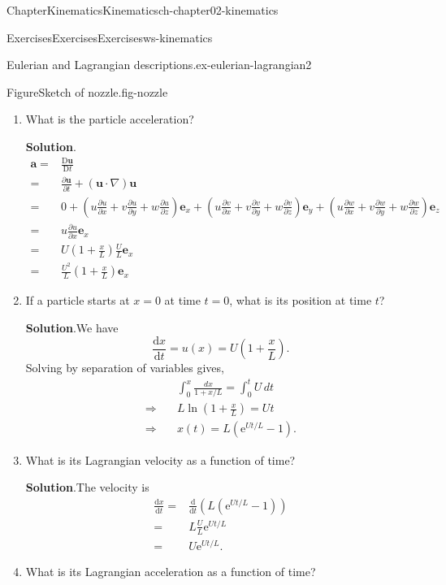 \documentclass[oneside,10pt,]{book}
\newcommand{\blocktitlefont}{\relax}
\numberwithin{equation}{section}
\newcommand{\e}{\mathrm{e}}
\newcommand{\de}{\mathrm{d}}
\newcommand{\dd}[2]{\frac{\de#1}{\de#2}}
\newcommand{\DD}[2]{\frac{\mathrm{D}#1}{\mathrm{D}#2}}
\newcommand{\pd}[2]{\frac{\partial#1}{\partial#2}}
\newcommand{\be}{\boldsymbol{e}}
\newcommand{\bu}{\boldsymbol{u}}
\newcommand{\ba}{\boldsymbol{a}}
\begin{document}
\begin{chapterptx}{Chapter}{Kinematics}{}{Kinematics}{}{}{ch-chapter02-kinematics}
\begin{exercises-section}{Exercises}{Exercises}{}{Exercises}{}{}{ws-kinematics}
\begin{divisionexercise}{4}{Eulerian and Lagrangian descriptions.}{}{ex-eulerian-lagrangian2}
\begin{figureptx}{Figure}{Sketch of nozzle.}{fig-nozzle}{}
\begin{image}{0.2}{0.6}{0.2}{}
\end{image}%
\tcblower
\end{figureptx}%
\begin{enumerate}[font=\bfseries,label=(\alph*),ref=\alph*]%
\item{}What is the particle acceleration?%
\par\smallskip%
\noindent\textbf{\blocktitlefont Solution}.\hypertarget{ex-eulerian-lagrangian2-3-2}{}\quad{}%
\begin{align*}
\ba=&\DD{\bu}{t} \\
=& \pd{\bu}{t} + (\bu \cdot \nabla) \bu\\
=&0+\left(u\pd{u}{x}+v\pd{u}{y}+w\pd{u}{z}\right)\be_x
+\left(u\pd{v}{x}+v\pd{v}{y}+w\pd{v}{z}\right)\be_y
+\left(u\pd{w}{x}+v\pd{w}{y}+w\pd{w}{z}\right)\be_z\\
=& u\pd{u}{x}\be_x\\
= & U\left(1+\frac{x}{L}\right)\frac{U}{L}\be_x\\
= & \frac{U^2}{L}\left(1+\frac{x}{L}\right)\be_x
\end{align*}
%
\item{}If a particle starts at \(x=0\) at time \(t=0\), what is its position at time \(t\)?%
\par\smallskip%
\noindent\textbf{\blocktitlefont Solution}.\hypertarget{ex-eulerian-lagrangian2-4-2}{}\quad{}We have%
\begin{equation*}
\dd{x}{t}=u(x)=U\left(1+\frac{x}{L}\right).
\end{equation*}
Solving by separation of variables gives,%
\begin{align*}
&\int_0^x\frac{dx}{1+x/L}=\int_0^t U\,dt\\
\Rightarrow\quad& L\ln\left(1+\frac{x}{L}\right)=Ut\\
\Rightarrow\quad& x(t)=L\left(\e^{Ut/L}-1\right).
\end{align*}
%
\item{}What is its Lagrangian velocity as a function of time?%
\par\smallskip%
\noindent\textbf{\blocktitlefont Solution}.\hypertarget{ex-eulerian-lagrangian2-5-2}{}\quad{}The velocity is%
\begin{align*}
\dd{x}{t}=&\dd{}{t}\left(L\left(\e^{Ut/L}-1\right)\right)\\
=& L\frac{U}{L}\e^{Ut/L}\\
=& U\e^{Ut/L}.
\end{align*}
%
\item{}What is its Lagrangian acceleration as a function of time?%

\end{enumerate}
\end{divisionexercise}
\end{exercises-section}
\end{chapterptx}
\end{document}
